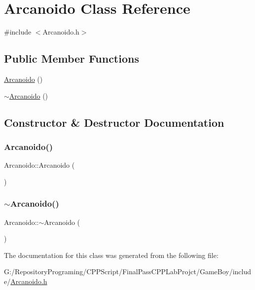\hypertarget{class_arcanoido}{}\section{Arcanoido Class Reference}
\label{class_arcanoido}


{\ttfamily \#include $<$Arcanoido.\+h$>$}

\subsection*{Public Member Functions}
\begin{DoxyCompactItemize}
\item 
\mbox{\hyperlink{class_arcanoido_a456b23363fbda75c968b786db4cee352}{Arcanoido}} ()
\item 
\mbox{\hyperlink{class_arcanoido_a82ff20cfdb46392ec6fa6e08915a5726}{$\sim$\+Arcanoido}} ()
\end{DoxyCompactItemize}


\subsection{Constructor \& Destructor Documentation}
\mbox{\label{class_arcanoido_a456b23363fbda75c968b786db4cee352}} 
\subsubsection{\texorpdfstring{Arcanoido()}{Arcanoido()}}
{\footnotesize\ttfamily Arcanoido\+::\+Arcanoido (\begin{DoxyParamCaption}{ }\end{DoxyParamCaption})}

\mbox{\label{class_arcanoido_a82ff20cfdb46392ec6fa6e08915a5726}} 
\subsubsection{\texorpdfstring{$\sim$Arcanoido()}{~Arcanoido()}}
{\footnotesize\ttfamily Arcanoido\+::$\sim$\+Arcanoido (\begin{DoxyParamCaption}{ }\end{DoxyParamCaption})}



The documentation for this class was generated from the following file\+:\begin{DoxyCompactItemize}
\item 
G\+:/\+Repository\+Programing/\+C\+P\+P\+Script/\+Final\+Pass\+C\+P\+P\+Lab\+Projct/\+Game\+Boy/include/\mbox{\hyperlink{_arcanoido_8h}{Arcanoido.\+h}}\end{DoxyCompactItemize}
